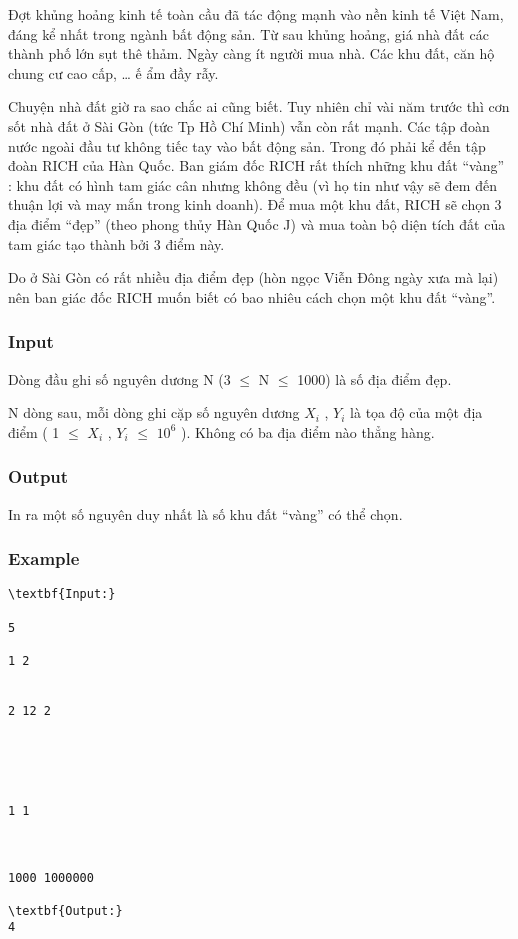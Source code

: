 



   Đợt khủng hoảng kinh tế toàn cầu đã tác động mạnh vào nền kinh tế Việt Nam, đáng kể nhất trong ngành bất động sản. Từ sau khủng hoảng, giá nhà đất các thành phố lớn sụt thê thảm. Ngày càng ít người mua nhà. Các khu đất, căn hộ chung cư cao cấp, … ế ẩm đầy rẫy.  

   Chuyện nhà đất giờ ra sao chắc ai cũng biết. Tuy nhiên chỉ vài năm trước thì cơn sốt nhà đất ở Sài Gòn (tức Tp Hồ Chí Minh) vẫn còn rất mạnh. Các tập đoàn nước ngoài đầu tư không tiếc tay vào bất động sản. Trong đó phải kể đến tập đoàn RICH của Hàn Quốc. Ban giám đốc RICH rất thích những khu đất “vàng” : khu đất có hình tam giác cân nhưng không đều (vì họ tin như vậy sẽ đem đến thuận lợi và may mắn trong kinh doanh). Để mua một khu đất, RICH sẽ chọn 3 địa điểm “đẹp” (theo phong thủy Hàn Quốc J) và mua toàn bộ diện tích đất của tam giác tạo thành bởi 3 điểm này.  

   Do ở Sài Gòn có rất nhiều địa điểm đẹp (hòn ngọc Viễn Đông ngày xưa mà lại) nên ban giác đốc RICH muốn biết có bao nhiêu cách chọn một khu đất “vàng”.  

\subsubsection{   Input  }

   Dòng đầu ghi số nguyên dương N (3  $\le$  N  $\le$  1000) là số địa điểm đẹp.  

   N dòng sau, mỗi dòng ghi cặp số nguyên dương $X_{i}$   , $Y_{i}$   là tọa độ của một địa điểm ( 1  $\le$  $X_{i}$   , $Y_{i}$    $\le$  $10^{6}$   ). Không có ba địa điểm nào thẳng hàng.  

\subsubsection{   Output  }

   In ra một số nguyên duy nhất là số khu đất “vàng” có thể chọn.  

\subsubsection{   Example  }
\begin{verbatim}
\textbf{Input:}

5

1 2


2 12 2





1 1



1000 1000000

\textbf{Output:}
4
\end{verbatim}
